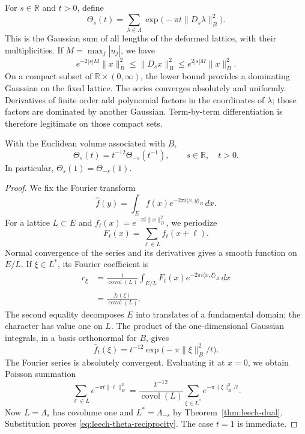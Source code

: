For \(s\in\mathbb R\) and \(t>0\), define
\begin{equation}
 \Theta_s(t)=\sum_{\lambda\in\Lambda}
                \exp\bigl(-\pi t\|D_s\lambda\|_B^2\bigr).
 \label{eq:leech-theta-real}
\end{equation}
This is the Gaussian sum of all lengths of the deformed lattice,
with their multiplicities. If \(M=\max_j|u_j|\), we have
\begin{equation}
 e^{-2|s|M}\|x\|_B^2
 \leq\|D_sx\|_B^2
 \leq e^{2|s|M}\|x\|_B^2.
 \label{eq:leech-quadratic-bounds}
\end{equation}
On a compact subset of \(\mathbb R\times(0,\infty)\), the lower
bound provides a dominating Gaussian on the fixed lattice.
The series converges absolutely and uniformly. Derivatives of
finite order add polynomial factors in the coordinates of
\(\lambda\); those factors are dominated by another Gaussian.
Term-by-term differentiation is therefore
legitimate on those compact sets.

\begin{theorem}
\label{thm:leech-theta}
With the Euclidean volume associated with \(B\),
\begin{equation}
 \Theta_s(t)=t^{-12}\Theta_{-s}(t^{-1}),
 \qquad s\in\mathbb R,\quad t>0.
 \label{eq:leech-theta-reciprocity}
\end{equation}
In particular, \(\Theta_s(1)=\Theta_{-s}(1)\).
\end{theorem}
\begin{proof}
We fix the Fourier transform
\[
 \widehat f(y)=\int_E
      f(x)e^{-2\pi i\langle x,y\rangle_B}\,dx.
\]
For a lattice \(L\subset E\) and
\(f_t(x)=e^{-\pi t\|x\|_B^2}\), we periodize
\[
 F_t(x)=\sum_{\ell\in L}f_t(x+\ell).
\]
Normal convergence of the series and its derivatives gives a smooth
function on \(E/L\). If \(\xi\in L^*\), its Fourier coefficient is
\[
\begin{split}
 c_\xi
 &=\frac1{\operatorname{covol}(L)}
   \int_{E/L}F_t(x)e^{-2\pi i\langle x,\xi\rangle_B}\,dx\\
 &=\frac{\widehat f_t(\xi)}{\operatorname{covol}(L)}.
\end{split}
\]
The second equality decomposes \(E\) into translates of a fundamental
domain; the character has value one on \(L\). The product
of the one-dimensional Gaussian integrals, in a basis
orthonormal for \(B\), gives
\[
 \widehat f_t(\xi)=
 t^{-12}\exp\bigl(-\pi\|\xi\|_B^2/t\bigr).
\]
The Fourier series is absolutely convergent. Evaluating it at
\(x=0\), we obtain Poisson summation
\[
 \sum_{\ell\in L}e^{-\pi t\|\ell\|_B^2}
 =\frac{t^{-12}}{\operatorname{covol}(L)}
      \sum_{\xi\in L^*}e^{-\pi\|\xi\|_B^2/t}.
\]
Now \(L=\Lambda_s\) has covolume one and
\(L^*=\Lambda_{-s}\) by Theorem~\ref{thm:leech-dual}.
Substitution proves \eqref{eq:leech-theta-reciprocity}.
The case \(t=1\) is immediate.
\end{proof}

